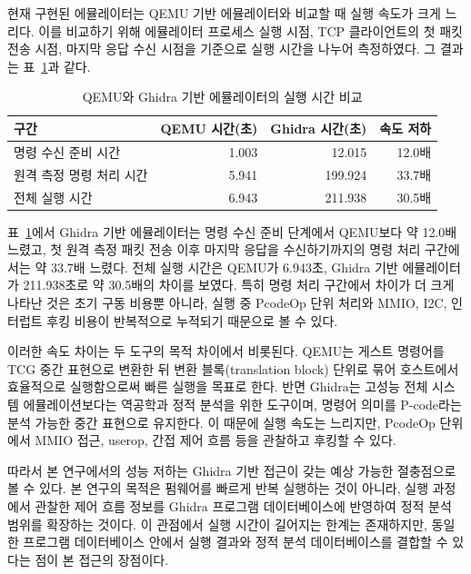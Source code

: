 \documentclass[master,korean,final]{kaist-ucs}
\begin{document}
현재 구현된 에뮬레이터는 QEMU 기반 에뮬레이터와 비교할 때 실행 속도가 크게 느리다. 이를 비교하기 위해 에뮬레이터 프로세스 실행 시점, TCP 클라이언트의 첫 패킷 전송 시점, 마지막 응답 수신 시점을 기준으로 실행 시간을 나누어 측정하였다. 그 결과는 표~\ref{tab:speed-comparison}과 같다.

\begin{table}[t]
\caption{QEMU와 Ghidra 기반 에뮬레이터의 실행 시간 비교}
\label{tab:speed-comparison}
\begin{center}
\begin{tabular}{lrrr}
\hline\hline
구간 & QEMU 시간(초) & Ghidra 시간(초) & 속도 저하 \\
\hline
명령 수신 준비 시간 & 1.003 & 12.015 & 12.0배 \\
원격 측정 명령 처리 시간 & 5.941 & 199.924 & 33.7배 \\
전체 실행 시간 & 6.943 & 211.938 & 30.5배 \\
\hline\hline
\end{tabular}
\end{center}
\end{table}

표~\ref{tab:speed-comparison}에서 Ghidra 기반 에뮬레이터는 명령 수신 준비 단계에서 QEMU보다 약 12.0배 느렸고, 첫 원격 측정 패킷 전송 이후 마지막 응답을 수신하기까지의 명령 처리 구간에서는 약 33.7배 느렸다. 전체 실행 시간은 QEMU가 6.943초, Ghidra 기반 에뮬레이터가 211.938초로 약 30.5배의 차이를 보였다. 특히 명령 처리 구간에서 차이가 더 크게 나타난 것은 초기 구동 비용뿐 아니라, 실행 중 PcodeOp 단위 처리와 MMIO, I2C, 인터럽트 후킹 비용이 반복적으로 누적되기 때문으로 볼 수 있다.

이러한 속도 차이는 두 도구의 목적 차이에서 비롯된다. QEMU는 게스트 명령어를 TCG 중간 표현으로 변환한 뒤 변환 블록(translation block) 단위로 묶어 호스트에서 효율적으로 실행함으로써 빠른 실행을 목표로 한다. 반면 Ghidra는 고성능 전체 시스템 에뮬레이션보다는 역공학과 정적 분석을 위한 도구이며, 명령어 의미를 P-code라는 분석 가능한 중간 표현으로 유지한다. 이 때문에 실행 속도는 느리지만, PcodeOp 단위에서 MMIO 접근, userop, 간접 제어 흐름 등을 관찰하고 후킹할 수 있다.

따라서 본 연구에서의 성능 저하는 Ghidra 기반 접근이 갖는 예상 가능한 절충점으로 볼 수 있다. 본 연구의 목적은 펌웨어를 빠르게 반복 실행하는 것이 아니라, 실행 과정에서 관찰한 제어 흐름 정보를 Ghidra 프로그램 데이터베이스에 반영하여 정적 분석 범위를 확장하는 것이다. 이 관점에서 실행 시간이 길어지는 한계는 존재하지만, 동일한 프로그램 데이터베이스 안에서 실행 결과와 정적 분석 데이터베이스를 결합할 수 있다는 점이 본 접근의 장점이다.
\end{document}
